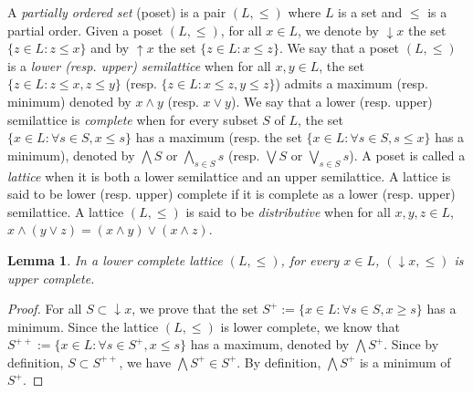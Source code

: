 \documentclass{article}
\newcommand{\blue}{\color{blue}}
\newtheorem{lemma}[theorem]{Lemma}
\begin{document}
A \textit{partially ordered set} (poset) is a pair $(L,\le)$ where $L$ is a set and $\le$ is a partial order. 
Given a poset $(L,\le)$, for all $x \in L$, we denote by $\mathop{\downarrow}x$ the set $\{z \in L : z \le x\}$ and by $\mathop{\uparrow}x$ the set $\{z \in L : x \le z\}$. 
We say that a poset $(L,\le)$ is a \textit{lower (resp. upper) semilattice} when for all $x,y \in L$, the set $\{z \in L : z \le x , z \le y\}$ (resp. $\{z \in L : x \le z , y \le z\}$) admits a maximum (resp. minimum) denoted by $x \wedge y$ (resp. $x \vee y$). We say that a lower (resp. upper) semilattice is \textit{complete} when for every subset $S$ of $L$, the set $\{x \in L : \forall s \in S, x \le s\}$ has a maximum (resp. the set $\{x \in L : \forall s \in S, s \le x\}$ has a minimum), denoted by $\bigwedge S$ or $\bigwedge_{s \in S} s$ (resp. $\bigvee S$ or $\bigvee_{s \in S}s$). A poset is called a \textit{lattice} when it is both a lower semilattice and an upper semilattice. A lattice is said to be lower (resp. upper) complete if it is complete as a lower (resp. upper) semilattice. A lattice $(L,\le)$ is said to be \textit{distributive} when for all $x,y,z \in L$, $x \wedge (y \vee z) = (x \wedge y) \vee (x \wedge z)$.%

\begin{lemma}\label{lemma.upper.complete.ideals}
    In a %
    lower complete lattice $(L,\le)$, for every $x \in L$, $(\mathop{\downarrow}x,\le)$ is upper complete.
\end{lemma}

\begin{proof}
    For all $S \subset \mathop{\downarrow}x$, we prove that the set 
    $S^+ := \{x \in L : \forall s \in S, x \ge s\}$ has a minimum. Since the lattice $(L,\le)$ is lower complete, we know that $S^{++} := \{x \in L : \forall s \in S^+, x \le s\}$ has a maximum, denoted by $\bigwedge S^+$. Since by definition, $S \subset S^{++}$, we have $\bigwedge S^+ \in S^+$. By definition, $\bigwedge S^+$ is a minimum of $S^+$.
\end{proof}
\end{document}
